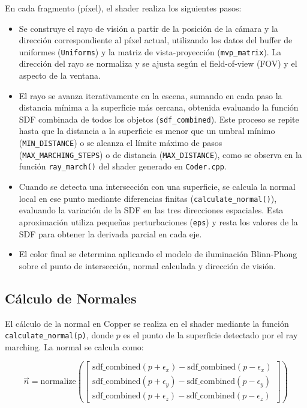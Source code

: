 En cada fragmento (píxel), el shader realiza los siguientes pasos:
\begin{itemize}
    \item Se construye el rayo de visión a partir de la posición de la cámara y la
          dirección correspondiente al píxel actual, utilizando los datos del buffer de
          uniformes (\texttt{Uniforms}) y la matriz de vista-proyección
          (\texttt{mvp\_matrix}). La dirección del rayo se normaliza y se ajusta según el
          field-of-view (FOV) y el aspecto de la ventana.
    \item El rayo se avanza iterativamente en la escena, sumando en cada paso la
          distancia mínima a la superficie más cercana, obtenida evaluando la función SDF
          combinada de todos los objetos (\texttt{sdf\_combined}). Este proceso se repite
          hasta que la distancia a la superficie es menor que un umbral mínimo
          (\texttt{MIN\_DISTANCE}) o se alcanza el límite máximo de pasos
          (\texttt{MAX\_MARCHING\_STEPS}) o de distancia (\texttt{MAX\_DISTANCE}), como
          se observa en la función \texttt{ray\_march()} del shader generado en
          \texttt{Coder.cpp}.
    \item Cuando se detecta una intersección con una superficie, se calcula la normal
          local en ese punto mediante diferencias finitas (\texttt{calculate\_normal()}),
          evaluando la variación de la SDF en las tres direcciones espaciales. Esta
          aproximación utiliza pequeñas perturbaciones (\texttt{eps}) y resta los valores
          de la SDF para obtener la derivada parcial en cada eje.
    \item El color final se determina aplicando el modelo de iluminación Blinn-Phong
          sobre el punto de intersección, normal calculada y dirección de visión.
\end{itemize}

\subsection{Cálculo de Normales}

El cálculo de la normal en Copper se realiza en el shader mediante la función
\texttt{calculate\_normal(p)}, donde $p$ es el punto de la superficie detectado
por el ray marching. La normal se calcula como:

\begin{equation}
    \vec{n} = \text{normalize}(
    \begin{bmatrix}
        \text{sdf\_combined}(p+\epsilon_x) - \text{sdf\_combined}(p-\epsilon_x) \\
        \text{sdf\_combined}(p+\epsilon_y) - \text{sdf\_combined}(p-\epsilon_y) \\
        \text{sdf\_combined}(p+\epsilon_z) - \text{sdf\_combined}(p-\epsilon_z)
    \end{bmatrix}
    )
\end{equation}

